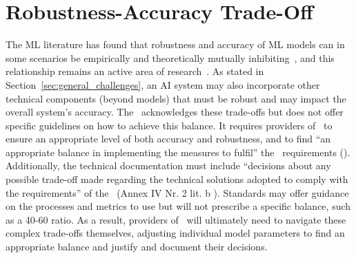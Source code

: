 \section{Robustness-Accuracy Trade-Off}\label{apx:robustness-accuracy-trade-off}
% 
The ML literature has found that robustness and accuracy of ML models can in some scenarios be empirically and theoretically mutually inhibiting~\cite{zhang2019theoretically, li2024triangular, yang2020closer, raghunathan2020understanding, rade2022reducing}, and this relationship remains an active area of research~\cite{pang2022robustness}. 
%
As stated in Section~\ref{sec:general_challenges}, an AI system may also incorporate other technical components (beyond models) that must be robust and may impact the overall system's accuracy.
%
The \EUAIAct\ acknowledges these trade-offs but does not offer specific guidelines on how to achieve this balance. 
%
It requires providers of \HRAIS\ to ensure an appropriate level of both accuracy and robustness, and to find “an appropriate balance in implementing the measures to fulfil” the \EUAIAct\ requirements (). Additionally, the technical documentation must include “decisions about any possible trade-off made regarding the technical solutions adopted to comply with the requirements” of the \EUAIAct\ (Annex IV Nr. 2 lit. b \EUAIAct). Standards may offer guidance on the processes and metrics to use but will not prescribe a specific balance, such as a 40-60 ratio. As a result, providers of \HRAIS\ will ultimately need to navigate these complex trade-offs themselves, adjusting individual model parameters to find an appropriate balance and justify and document their decisions.

